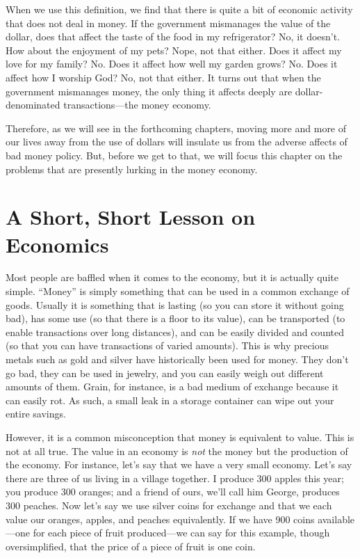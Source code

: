 When we use this definition, we
find that there is quite a bit of economic activity that does not deal
in money.  If the government mismanages the value of the dollar, does that affect
the taste of the food in my refrigerator?  No, it doesn’t. How about
the enjoyment of my pets?  Nope, not that either. Does it affect my
love for my family?  No. Does it affect how well my garden grows?  No.
Does it affect how I worship God? No, not that either. It turns out
that when the government mismanages money, the only thing it affects
deeply are dollar-denominated transactions---the money economy. 

Therefore, as we will see in the forthcoming chapters, moving more and more of our
lives away from the use of dollars will insulate us from the adverse
affects of bad money policy.  But, before we get to that, we will focus
this chapter on the problems that are presently lurking in the money economy.


\section{A Short, Short Lesson on Economics}

Most people are baffled when it comes to the economy, but it is actually
quite simple. “Money” is simply something that can be used in a common
exchange of goods. Usually it is something that is lasting (so you can
store it without going bad), has some use (so that there is a floor to
its value), can be transported (to enable transactions over long distances),
and can be easily divided and counted (so that you can
have transactions of varied amounts). This is why precious metals such
as gold and silver have historically been used for money. They don’t go
bad, they can be used in jewelry, and you can easily weigh out
different amounts of them. Grain, for instance, is a bad medium of exchange
because it can easily rot.  As such, a small leak in a storage container can
wipe out your entire savings.  

However, it is a common misconception that money is equivalent to value.
This is not at all true. The value in an economy is \textit{not} the
money but the production of the economy. For instance, let’s say that
we have a very small economy. Let’s say there are three of us living in
a village together. I produce 300 apples this year; you produce 300
oranges; and a friend of ours, we’ll call him George, produces 300
peaches. Now let’s say we use silver coins for exchange and that we
each value our oranges, apples, and peaches equivalently.
If we have 900 coins
available—one for each piece of fruit produced—we can say for this
example, though
oversimplified, that the price of a piece of fruit is one coin. 


